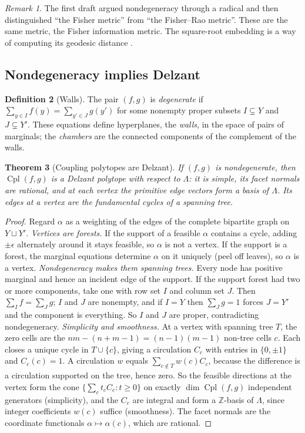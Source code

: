 \documentclass[11pt]{article}
\newtheorem{theorem}{Theorem}[section]
\theoremstyle{definition}
\newtheorem{definition}[theorem]{Definition}
\theoremstyle{remark}
\newtheorem{remark}[theorem]{Remark}
\newcommand{\Cpl}{\operatorname{Cpl}}
\begin{document}
\begin{remark}
The first draft argued nondegeneracy through a radical and then distinguished ``the Fisher metric''
from ``the Fisher--Rao metric''. These are the same metric, the Fisher information metric. The
square-root embedding is a way of computing its geodesic distance \cite[Prop.~8.1]{Awasthi-Attribution}.
\end{remark}

\subsection{Nondegeneracy implies Delzant}

\begin{definition}[Walls]\label{def:walls}
The pair $(f,g)$ is \emph{degenerate} if $\sum_{y\in I}f(y)=\sum_{y'\in J}g(y')$ for some
nonempty proper subsets $I\subsetneq Y$ and $J\subsetneq Y'$. These equations define hyperplanes,
the \emph{walls}, in the space of pairs of marginals; the \emph{chambers} are the connected components of
the complement of the walls.
\end{definition}

\begin{theorem}[Coupling polytopes are Delzant]\label{thm:delzant}
If $(f,g)$ is nondegenerate, then $\Cpl(f,g)$ is a Delzant polytope with respect to $\Lambda$: it is
simple, its facet normals are rational, and at each vertex the primitive edge vectors form a basis of
$\Lambda$. Its edges at a vertex are the fundamental cycles of a spanning tree.
\end{theorem}
\begin{proof}
Regard $\alpha$ as a weighting of the edges of the complete bipartite graph on $Y\sqcup Y'$.
\emph{Vertices are forests.} If the support of a feasible $\alpha$ contains a cycle, adding $\pm\epsilon$
alternately around it stays feasible, so $\alpha$ is not a vertex. If the support is a forest, the
marginal equations determine $\alpha$ on it uniquely (peel off leaves), so $\alpha$ is a vertex.
\emph{Nondegeneracy makes them spanning trees.} Every node has positive marginal and hence an incident
edge of the support. If the support forest had two or more components, take one with row set $I$ and
column set $J$. Then $\sum_If=\sum_Jg$; $I$ and $J$ are nonempty, and if $I=Y$ then $\sum_Jg=1$ forces
$J=Y'$ and the component is everything. So $I$ and $J$ are proper, contradicting nondegeneracy.
\emph{Simplicity and smoothness.} At a vertex with spanning tree $T$, the zero cells are the
$nm-(n+m-1)=(n-1)(m-1)$ non-tree cells $c$. Each closes a unique cycle in $T\cup\{c\}$, giving a
circulation $C_c$ with entries in $\{0,\pm1\}$ and $C_c(c)=1$. A circulation $w$ equals
$\sum_{c\notin T}w(c)C_c$, because the difference is a circulation supported on the tree, hence zero.
So the feasible directions at the vertex form the cone $\{\sum_ct_cC_c:t\ge0\}$ on exactly
$\dim\Cpl(f,g)$ independent generators (simplicity), and the $C_c$ are integral and form a $\mathbb{Z}$-basis
of $\Lambda$, since integer coefficients $w(c)$ suffice (smoothness). The facet normals are the coordinate
functionals $\alpha\mapsto\alpha(c)$, which are rational.
\end{proof}
\end{document}
